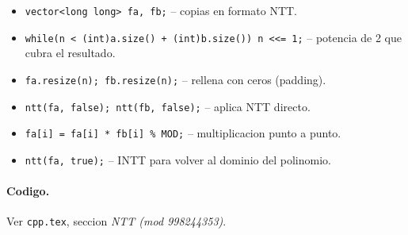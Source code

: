 \begin{itemize}\setlength\itemsep{0pt}
	\item \verb|vector<long long> fa, fb;| -- copias en formato NTT.
	\item \verb|while(n < (int)a.size() + (int)b.size()) n <<= 1;| -- potencia de 2 que cubra el resultado.
	\item \verb|fa.resize(n); fb.resize(n);| -- rellena con ceros (padding).
	\item \verb|ntt(fa, false); ntt(fb, false);| -- aplica NTT directo.
	\item \verb|fa[i] = fa[i] * fb[i] % MOD;| -- multiplicacion punto a punto.
	\item \verb|ntt(fa, true);| -- INTT para volver al dominio del polinomio.
\end{itemize}

\paragraph{Codigo.}
Ver \texttt{cpp.tex}, seccion \textit{NTT (mod 998244353)}.

\vspace{0.5em|||}
